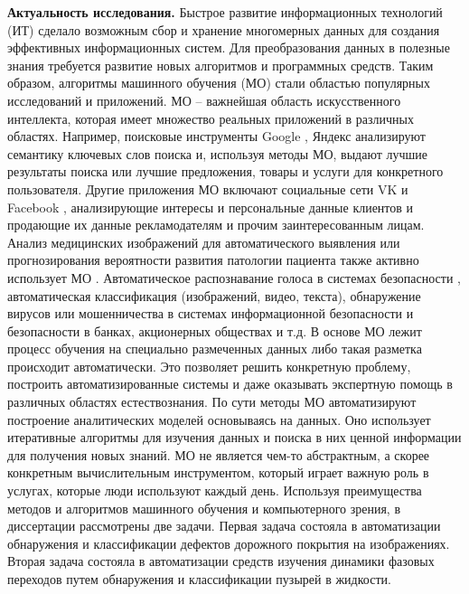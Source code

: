 
\textbf{Актуальность исследования.}
Быстрое развитие информационных технологий (ИТ) сделало возможным сбор и хранение многомерных данных для создания эффективных информационных систем. Для преобразования данных в полезные знания требуется развитие новых алгоритмов и программных средств. Таким образом, алгоритмы машинного обучения (МО) стали областью популярных исследований и приложений. МО\cite{h1, h2} -- важнейшая область искусственного интеллекта, которая имеет множество реальных приложений в различных областях. Например, поисковые инструменты Google \cite{h3}, Яндекс \cite{h4} анализируют семантику ключевых слов поиска и, используя методы МО, выдают лучшие результаты поиска или лучшие предложения, товары и услуги для конкретного пользователя. Другие приложения МО включают социальные сети VK \cite{h5} и Facebook \cite{h6}, анализирующие интересы и персональные данные клиентов и продающие их данные рекламодателям и прочим заинтересованным лицам. Анализ медицинских изображений для автоматического выявления или прогнозирования вероятности развития патологии пациента  также активно использует МО \cite{h7, h8}. Автоматическое распознавание голоса в системах безопасности \cite{h9, h10}, автоматическая классификация (изображений, видео, текста), обнаружение вирусов или мошенничества в системах информационной безопасности и безопасности в банках, акционерных обществах \cite{h11, h12} и т.д. В основе МО лежит процесс обучения на специально размеченных данных либо такая разметка происходит автоматически. Это позволяет решить конкретную проблему, построить автоматизированные системы  и даже оказывать экспертную помощь в различных областях естествознания. По сути методы МО автоматизируют построение аналитических моделей основываясь на данных. Оно использует итеративные алгоритмы для изучения данных и поиска в них ценной информации для получения новых знаний. МО не является чем-то абстрактным, а скорее конкретным вычислительным инструментом, который играет важную роль в услугах, которые люди используют каждый день. Используя преимущества методов и  алгоритмов машинного обучения и компьютерного зрения, в диссертации рассмотрены две задачи. Первая задача состояла в автоматизации обнаружения и классификации дефектов дорожного покрытия на изображениях. Вторая задача состояла в автоматизации средств изучения динамики фазовых переходов путем обнаружения и классификации пузырей в жидкости.

